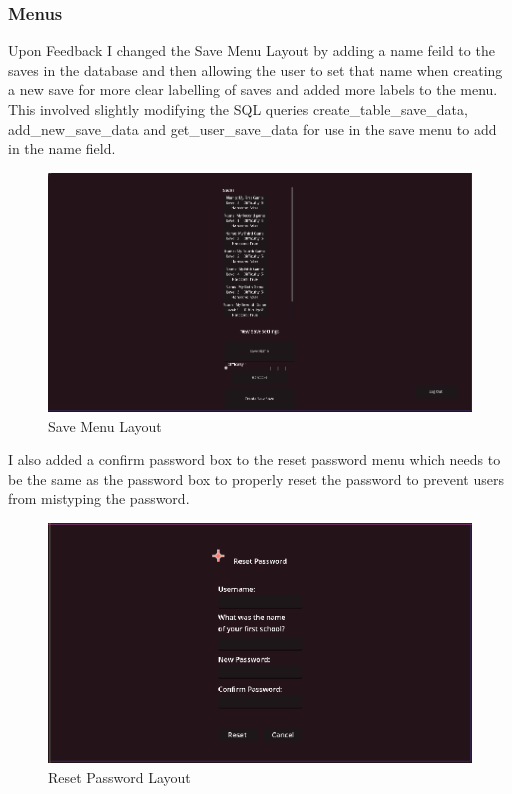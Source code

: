 \documentclass{article}
\begin{document}
        \subsubsection{Menus}
        Upon Feedback I changed the Save Menu Layout by adding a name feild to the saves in the database and then allowing the user to set that name when creating a new save for more clear labelling of saves and added more labels to the menu. This involved slightly modifying the SQL queries create\_table\_save\_data, add\_new\_save\_data and get\_user\_save\_data for use in the save menu to add in the name field.\\
        \begin{figure}[H]
                \centering
                \includegraphics[width = 0.8\columnwidth]{images/development/SaveMenu_layout2.PNG}
                \caption{Save Menu Layout}
        \end{figure}
        I also added a confirm password box to the reset password menu which needs to be the same as the password box to properly reset the password to prevent users from mistyping the password.\\
        \begin{figure}[H]
                \centering
                \includegraphics[width = 0.8\columnwidth]{images/development/ResetPassword_layout2.PNG}
                \caption{Reset Password Layout}
        \end{figure}
\end{document}
